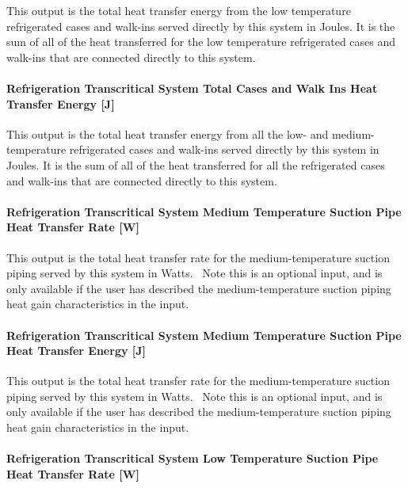 This output is the total heat transfer energy from the low temperature refrigerated cases and walk-ins served directly by this system in Joules. It is the sum of all of the heat transferred for the low temperature refrigerated cases and walk-ins that are connected directly to this system.

\paragraph{Refrigeration Transcritical System Total Cases and Walk Ins Heat Transfer Energy {[}J{]}}\label{refrigeration-transcritical-system-total-cases-and-walk-ins-heat-transfer-energy-j}

This output is the total heat transfer energy from all the low- and medium-temperature refrigerated cases and walk-ins served directly by this system in Joules. It is the sum of all of the heat transferred for all the refrigerated cases and walk-ins that are connected directly to this system.

\paragraph{Refrigeration Transcritical System Medium Temperature Suction Pipe Heat Transfer Rate {[}W{]}}\label{refrigeration-transcritical-system-medium-temperature-suction-pipe-heat-transfer-rate-w}

This output is the total heat transfer rate for the medium-temperature suction piping served by this system in Watts.~ Note this is an optional input, and is only available if the user has described the medium-temperature suction piping heat gain characteristics in the input.

\paragraph{Refrigeration Transcritical System Medium Temperature Suction Pipe Heat Transfer Energy {[}J{]}}\label{refrigeration-transcritical-system-medium-temperature-suction-pipe-heat-transfer-energy-j}

This output is the total heat transfer rate for the medium-temperature suction piping served by this system in Watts.~ Note this is an optional input, and is only available if the user has described the medium-temperature suction piping heat gain characteristics in the input.

\paragraph{Refrigeration Transcritical System Low Temperature Suction Pipe Heat Transfer Rate {[}W{]}}\label{refrigeration-transcritical-system-low-temperature-suction-pipe-heat-transfer-rate-w}

